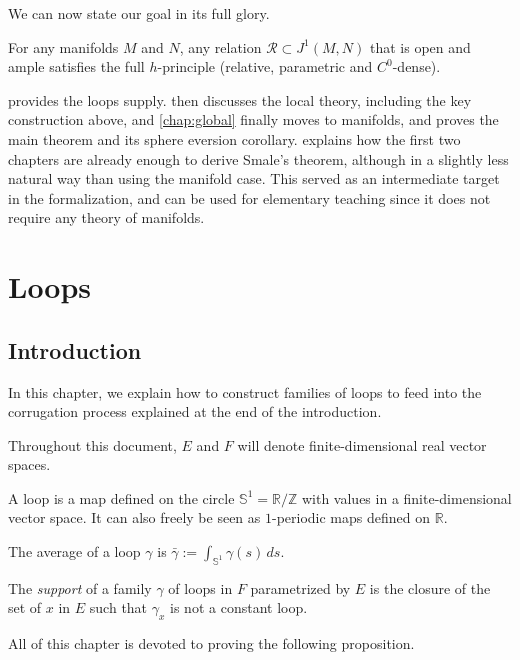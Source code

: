\documentclass[10pt,a4paper]{article}
\newcounter{chapter}
\newcommand{\Rel}{\mathcal{R}} %
\newcommand{\lean}[1]{}
\newcommand{\leanok}{}
\begin{document}
We can now state our goal in its full glory.

\begin{theorem-intro}[Gromov]
  For any manifolds $M$ and $N$, any relation $\Rel ⊂ J^1(M, N)$ that is open
  and ample satisfies the full $h$-principle (relative, parametric and $C^0$-dense).
\end{theorem-intro}

 provides the loops supply.  then
discusses the local theory, including the key construction above,
and \cref{chap:global} finally moves to manifolds, and proves the main
theorem and its sphere eversion corollary.
 explains how the first two chapters are already
enough to derive Smale's theorem, although in a slightly less natural way than
using the manifold case. This served as an intermediate target in the
formalization, and can be used for elementary teaching since it does not
require any theory of manifolds.

\chapter{Loops}
\label{chap:loops}

\section{Introduction}
\label{sec:loops_introduction}

In this chapter, we explain how to construct families of loops to feed into the
corrugation process explained at the end of the introduction.

Throughout this document, $E$ and $F$ will denote finite-dimensional
real vector spaces.

\begin{definition}
  \label{def:loop}
  \lean{Loop, Loop.average, Loop.support}
  \leanok
  A loop is a map defined on the circle $𝕊^1 = ℝ/ℤ$ with values in a
  finite-dimensional vector space.
  It can also freely be seen as $1$-periodic maps defined on $ℝ$.

  The average of a loop $γ$ is $\bar γ := \int_{𝕊^1} γ(s)\, ds$.

  The \emph{support} of a family $γ$ of loops in $F$ parametrized by $E$ is
  the closure of the set of $x$ in $E$ such that $γ_x$ is not a constant loop.
\end{definition}

All of this chapter is devoted to proving the following proposition.
\end{document}
